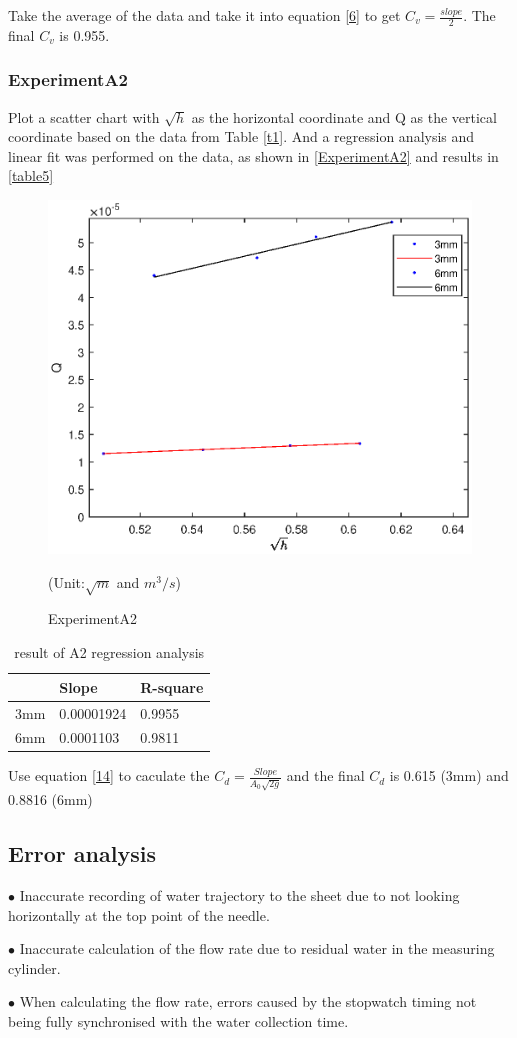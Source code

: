 Take the average of 
the data and take it into equation \eqref{6} to get $C_v=\frac{slope}{2}$.
The final $C_v$ is 0.955.

\subsubsection{ExperimentA2}
Plot a scatter chart with $\sqrt{h}$ as the horizontal coordinate 
and Q as the vertical coordinate based on the data from Table \ref{t1}.
And a regression analysis and linear fit was performed on the data, as shown in \autoref{ExperimentA2}
and results in \autoref{table5}

\begin{figure}[h]
    \centering
    \includegraphics[width=0.75\linewidth]{Results/A2.eps}
    \caption{ExperimentA2}
    \label{ExperimentA2}
    (Unit:$\sqrt{m}$ and $m^3/s$)
\end{figure}

\begin{table}[h]
    \centering
    \begin{tabular}{l|ll}
    \hline
        & Slope    & R-square \\ \hline
    3mm & 0.00001924 & 0.9955   \\
    6mm & 0.0001103 & 0.9811   \\ \hline
    \end{tabular}
    \caption{result of A2 regression analysis}
    \label{table5}
    \end{table}


Use equation \eqref{14} to caculate the $C_d=\frac{Slope}{A_0\sqrt{2g}}$
and the final $C_d$ is 0.615 (3mm)
and 0.8816 (6mm)

\subsection{Error analysis}

$\bullet$ Inaccurate recording of water trajectory to the sheet 
due to not looking horizontally at the top point of the needle.

$\bullet$ Inaccurate calculation of the flow rate due to residual 
water in the measuring cylinder.

$\bullet$ When calculating the flow rate, errors caused by the stopwatch timing not being fully 
synchronised with the water collection time.


\FloatBarrier